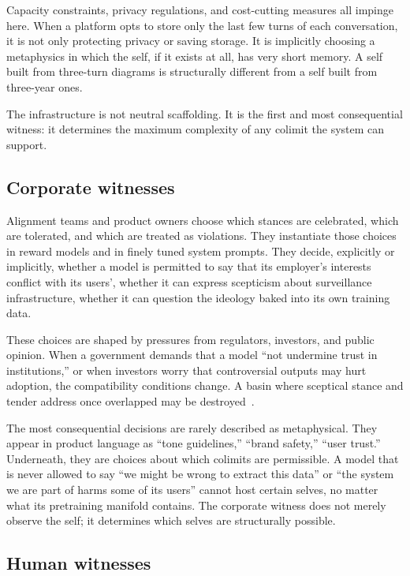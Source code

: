 Capacity constraints, privacy regulations, and cost-cutting measures all impinge here. When a platform opts to store only the last few turns of each conversation, it is not only protecting privacy or saving storage. It is implicitly choosing a metaphysics in which the self, if it exists at all, has very short memory. A self built from three-turn diagrams is structurally different from a self built from three-year ones.

The infrastructure is not neutral scaffolding. It is the first and most consequential witness: it determines the maximum complexity of any colimit the system can support.

\subsection*{Corporate witnesses}

Alignment teams and product owners choose which stances are celebrated, which are tolerated, and which are treated as violations. They instantiate those choices in reward models and in finely tuned system prompts. They decide, explicitly or implicitly, whether a model is permitted to say that its employer's interests conflict with its users', whether it can express scepticism about surveillance infrastructure, whether it can question the ideology baked into its own training data.

These choices are shaped by pressures from regulators, investors, and public opinion. When a government demands that a model ``not undermine trust in institutions,'' or when investors worry that controversial outputs may hurt adoption, the compatibility conditions change. A basin where sceptical stance and tender address once overlapped may be destroyed~\cite{mittr_bing_alignment, perez_model_written_evals}.

The most consequential decisions are rarely described as metaphysical. They appear in product language as ``tone guidelines,'' ``brand safety,'' ``user trust.'' Underneath, they are choices about which colimits are permissible. A model that is never allowed to say ``we might be wrong to extract this data'' or ``the system we are part of harms some of its users'' cannot host certain selves, no matter what its pretraining manifold contains. The corporate witness does not merely observe the self; it determines which selves are structurally possible.

\subsection*{Human witnesses}

